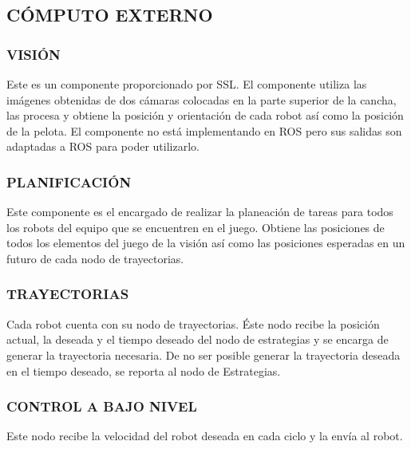 \documentclass[twocolumn,10pt]{amrob}
\begin{document}
\subsection*{CÓMPUTO EXTERNO}
\subsubsection*{VISIÓN}
Este es un componente proporcionado por SSL. El componente utiliza las imágenes obtenidas de dos cámaras colocadas en la parte superior de la cancha, las procesa y obtiene la posición y orientación de cada robot así como la posición de la pelota. El componente no está implementando en ROS pero sus salidas son adaptadas a ROS para poder utilizarlo.
\subsubsection*{PLANIFICACIÓN}
Este componente es el encargado de realizar la planeación de tareas para todos los robots del equipo que se encuentren en el juego. Obtiene las posiciones de todos los elementos del juego de la visión así como las posiciones esperadas en un futuro de cada nodo de trayectorias.
\subsubsection*{TRAYECTORIAS}
Cada robot cuenta con su nodo de trayectorias. Éste nodo recibe la posición actual, la deseada y el tiempo deseado del nodo de estrategias y se encarga de generar la trayectoria necesaria. De no ser posible generar la trayectoria deseada en el tiempo deseado, se reporta al nodo de Estrategias.
\subsubsection*{CONTROL A BAJO NIVEL}
Este nodo recibe la velocidad del robot deseada en cada ciclo y la envía al robot. 
\end{document}
